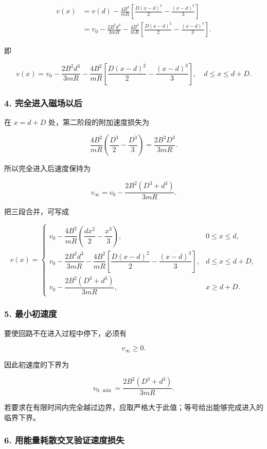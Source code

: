 \documentclass[12pt,a4paper,UTF8]{ctexart}
\begin{document}
\[
\begin{aligned}
v(x)
&=v(d)-\frac{4B^2}{mR}
\left[\frac{D(x-d)^2}{2}-\frac{(x-d)^3}{3}\right]\\
&=v_0-\frac{2B^2d^3}{3mR}
-\frac{4B^2}{mR}
\left[\frac{D(x-d)^2}{2}-\frac{(x-d)^3}{3}\right].
\end{aligned}
\]

即

\[
\boxed{
v(x)=v_0-\frac{2B^2d^3}{3mR}
-\frac{4B^2}{mR}
\left[\frac{D(x-d)^2}{2}-\frac{(x-d)^3}{3}\right],
\quad d\le x\le d+D
}.
\]

\subsubsection{4.
完全进入磁场以后}\label{ux5b8cux5168ux8fdbux5165ux78c1ux573aux4ee5ux540e}

在 \(x=d+D\) 处，第二阶段的附加速度损失为

\[
\frac{4B^2}{mR}\left(\frac{D^3}{2}-\frac{D^3}{3}\right)
=\frac{2B^2D^3}{3mR}.
\]

所以完全进入后速度保持为

\[
\boxed{
v_\infty=v_0-\frac{2B^2(D^3+d^3)}{3mR}
}.
\]

把三段合并，可写成

\[
v(x)=
\begin{cases}
v_0-\dfrac{4B^2}{mR}
\left(\dfrac{dx^2}{2}-\dfrac{x^3}{3}\right),
&0\le x\le d,\\[8pt]
v_0-\dfrac{2B^2d^3}{3mR}
-\dfrac{4B^2}{mR}
\left[\dfrac{D(x-d)^2}{2}-\dfrac{(x-d)^3}{3}\right],
&d\le x\le d+D,\\[8pt]
v_0-\dfrac{2B^2(D^3+d^3)}{3mR},
&x\ge d+D.
\end{cases}
\]

\subsubsection{5. 最小初速度}\label{ux6700ux5c0fux521dux901fux5ea6}

要使回路不在进入过程中停下，必须有

\[
v_\infty\ge0.
\]

因此初速度的下界为

\[
\boxed{
v_{0,\min}=\frac{2B^2(D^3+d^3)}{3mR}
}.
\]

若要求在有限时间内完全越过边界，应取严格大于此值；等号给出能够完成进入的临界下界。

\subsubsection{6.
用能量耗散交叉验证速度损失}\label{ux7528ux80fdux91cfux8017ux6563ux4ea4ux53c9ux9a8cux8bc1ux901fux5ea6ux635fux5931}
\end{document}
